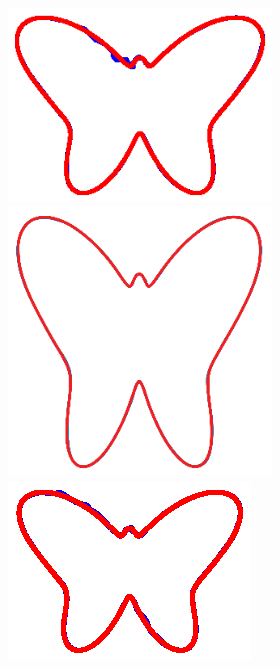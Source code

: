 \begin{figure}
\begin{subfigure}{\textwidth}
        \textbf{}\begin{subfigure}{\textwidth}
        \centering
        
        \includegraphics[trim=3cm 4cm 3cm 4cm, clip=true,height=.1\textheight]{Figures/Fig_T1/MATLAB/ST_T1_Trajectory.eps}
        \hspace{4em}
        \includegraphics[height=.08\textheight]{Figures/Fig_T1/Orig/ST_T1_Trajectory.png}
        \hspace{4em}
        \includegraphics[trim=6cm 4.5cm 6cm 4.5cm,clip=true,height=.1\textheight]{Figures/Fig_T1/Python/ST_T1_Trajectory.eps}
        

\end{subfigure}
\end{subfigure}
\end{figure}
